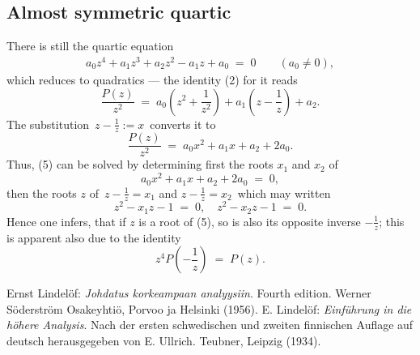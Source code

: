 \documentclass[12pt]{article}
\theoremstyle{definition}
\begin{document}
\subsection{Almost symmetric quartic}

There is still the quartic equation 
\begin{align}
a_0z^4+a_1z^3+a_2z^2-a_1z+a_0 \;=\; 0 \qquad (a_0 \neq 0),
\end{align}
which reduces to quadratics --- the identity (2) for it reads
$$\frac{P(z)}{z^2} \;=\; a_0\left(z^2+\frac{1}{z^2}\right)+a_1\left(z-\frac{1}{z}\right)+a_2.$$
The substitution \,$\displaystyle z-\frac{1}{z} := x$\, converts it to
$$\frac{P(z)}{z^2} \;=\; a_0x^2+a_1x+a_2+2a_0.$$
Thus, (5) can be solved by determining first the roots $x_1$ and $x_2$ of
$$a_0x^2+a_1x+a_2+2a_0 \;=\; 0,$$
then the roots $z$ of\, $z-\frac{1}{z} = x_1$ and $z-\frac{1}{z} = x_2$\, which may written
$$z^2-x_1z-1 \;=\; 0, \quad z^2-x_2z-1 \;=\; 0.$$
Hence one infers, that if $z$ is a root of (5), so is also its opposite inverse 
$-\frac{1}{z}$; this is apparent also due to the identity
$$z^4P\!\left(-\frac{1}{z}\right) \;=\; P(z).$$

\begin{thebibliography}{9}
 {\sc Ernst Lindel\"of}: \emph{Johdatus korkeampaan analyysiin}. Fourth edition. Werner S\"oderstr\"om Osakeyhti\"o, Porvoo ja Helsinki (1956).
 {\sc E. Lindel\"of}: \emph{Einf\"uhrung in die h\"ohere Analysis}. Nach der ersten schwedischen
und zweiten finnischen Auflage auf deutsch herausgegeben von E. Ullrich. Teubner, Leipzig (1934).
\end{thebibliography}
\end{document}
